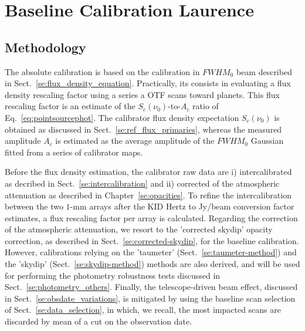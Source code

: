 \section{Baseline Calibration {\color{YellowGreen} Laurence} }
\label{se:baseline_calibration}

\subsection{Methodology}

The absolute calibration is based on the calibration in $FWHM_0$ beam
described in Sect.~\ref{se:flux_density_equation}. 
Practically, its consists in evaluating a flux
density rescaling factor using a series a OTF scans toward
planets. This flux rescaling factor is an estimate of the
$S_{c}(\nu_{0})$-to-$A_{c}$ ratio of Eq.~\ref{eq:pointsourcephot}. The
calibrator flux density expectation $S_{c}(\nu_{0})$ is obtained as
discussed in Sect.~\ref{se:ref_flux_primaries}, whereas the measured
amplitude $A_c$ is estimated as the average amplitude of the $FWHM_0$
Gaussian fitted from a series of calibrator maps.

Before the flux density estimation, the calibrator raw data are i)
intercalibrated as decribed
in Sect.~\ref{se:intercalibration} and ii) corrected of the
atmospheric attenuation as described in Chapter~\ref{se:opacities}. To
refine the intercalibration between the two $1$-mm arrays after the
KID Hertz to Jy/beam conversion factor estimates, a flux rescaling
factor per array is calculated. Regarding the correction of the
atmospheric attenuation, we
resort to the 'corrected skydip' opacity correction, as described in
Sect.~\ref{se:corrected-skydip}, for the baseline calibration.
However, calibrations relying on the
'taumeter' (Sect.~\ref{se:taumeter-method}) and the 'skydip'
(Sect.~\ref{se:skydip-method}) methods are also derived, and will be
used for performing the photometry robustness tests discussed in
Sect.~\ref{se:photometry_others}. Finally, the telescope-driven beam
effect, discussed in Sect.~\ref{se:obsdate_variations}, is mitigated by
using the baseline scan selection of
Sect.~\ref{se:data_selection}, in which, we recall, the most
impacted scans are discarded by mean of a cut on the observation
date. 

